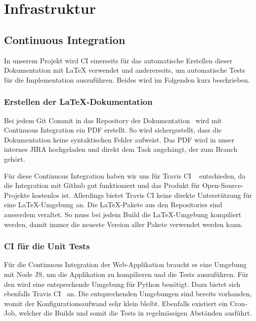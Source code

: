 
\section{Infrastruktur}
\label{Infrastruktur}

\subsection{Continuous Integration}
\label{Infrastruktur:Continuous Integration}

In unserem Projekt wird \ac{CI} einerseits für das automatische Erstellen dieser Dokumentation mit LaTeX verwendet und andererseits, um automatische Tests für die Implementation auszuführen.
Beides wird im Folgenden kurz beschrieben.

\subsubsection{Erstellen der LaTeX-Dokumentation}
\label{CI:Erstellen der LaTeX-Dokumentation}

Bei jedem Git Commit in das Repository der Dokumentation~\cite{github:thesis} wird mit Continuous Integration ein PDF erstellt.
So wird sichergestellt, dass die Dokumentation keine syntaktischen Fehler aufweist.
Das PDF wird in unser internes JIRA hochgeladen und direkt dem Task angehängt, der zum Branch gehört.

Für diese Continuous Integration haben wir uns für Travis CI ~\cite{travis-ci} entschieden, da die Integration mit Github gut funktioniert und das Produkt für Open-Source-Projekte kostenlos ist.
Allerdings bietet Travis CI keine direkte Unterstützung für eine LaTeX-Umgebung an. Die LaTeX-Pakete aus den Repositories sind ausserdem veraltet.
So muss bei jedem Build die LaTeX-Umgebung kompiliert werden, damit immer die neueste Version aller Pakete verwendet werden kann.


\subsubsection{CI für die Unit Tests}
\label{CI:CI für Backend}

Für die Continuous Integration der Web-Applikation braucht es eine Umgebung mit Node JS, um die Applikation zu kompilieren und die Tests auszuführen.
Für den  wird eine entsprechende Umgebung für Python benötigt.
Dazu bietet sich ebenfalls Travis CI~\cite{travis-ci} an.
Die entsprechenden Umgebungen sind bereits vorhanden, womit der Konfigurationsaufwand sehr klein bleibt.
Ebenfalls existiert ein Cron-Job, welcher die Builds und somit die Tests in regelmässigen Abständen ausführt.

